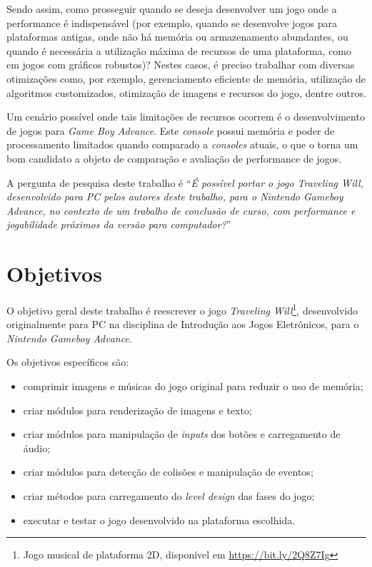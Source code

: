 Sendo assim, como prosseguir quando se deseja desenvolver um jogo onde a performance é indispensável (por exemplo, quando se desenvolve jogos para plataformas antigas, onde não há memória ou armazenamento abundantes, ou quando é necessária a utilização máxima de recursos de uma plataforma, como em jogos com gráficos robustos)? Nestes casos, é preciso trabalhar com diversas otimizações como, por exemplo, gerenciamento eficiente de memória, utilização de algoritmos customizados, otimização de imagens e recursos do jogo, dentre outros.

Um cenário possível onde tais limitações de recursos ocorrem é o desenvolvimento de jogos para \textit{Game Boy Advance}. Este \textit{console} possui memória e poder de processamento limitados quando comparado a \textit{consoles} atuais, o que o torna um bom candidato a objeto de comparação e avaliação de performance de jogos.

A pergunta de pesquisa deste trabalho é ``\textit{É possível portar o jogo Traveling Will, desenvolvido para PC pelos autores deste trabalho, para o Nintendo Gameboy Advance, no contexto de um trabalho de conclusão de curso, com performance e jogabilidade próximos da versão para computador?}''

\section*{Objetivos}

O objetivo geral deste trabalho é reescrever o jogo \textit{Traveling Will}\footnote{Jogo musical de plataforma 2D, disponível em \url{https://bit.ly/2Q8Z7Ig}}, desenvolvido originalmente para PC na disciplina de Introdução aos Jogos Eletrônicos, para o \textit{Nintendo Gameboy Advance}.

Os objetivos específicos são:

\begin{itemize}
\item comprimir imagens e músicas do jogo original para reduzir o uso de memória;
\item criar módulos para renderização de imagens e texto;
\item criar módulos para manipulação de \textit{inputs} dos botões e carregamento de áudio;
\item criar módulos para detecção de colisões e manipulação de eventos;
\item criar métodos para carregamento do \textit{level design} das fases do jogo;
\item executar e testar o jogo desenvolvido na plataforma escolhida.
\end{itemize}

